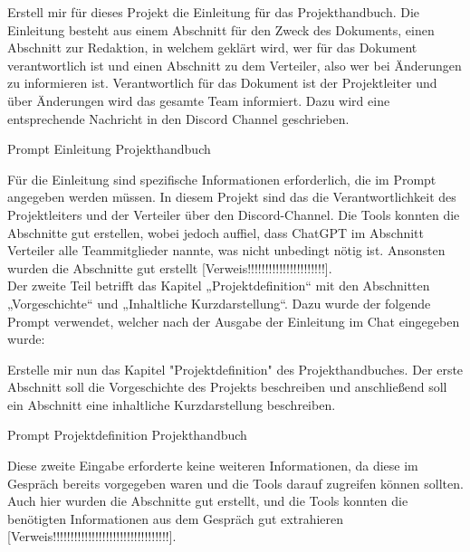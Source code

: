 \begin{prompt}[H]
    \begin{tcolorbox}[colback=gray!20, colframe=gray!20, boxrule=0pt, sharp corners] 
        Erstell mir für dieses Projekt die Einleitung für das Projekthandbuch. Die Einleitung besteht aus einem Abschnitt für 
        den Zweck des Dokuments, einen Abschnitt zur Redaktion, in welchem geklärt wird, wer für das Dokument verantwortlich ist 
        und einen Abschnitt zu dem Verteiler, also wer bei Änderungen zu informieren ist. Verantwortlich für das Dokument ist der 
        Projektleiter und über Änderungen wird das gesamte Team informiert. Dazu wird eine entsprechende Nachricht in den Discord 
        Channel geschrieben.
        \vfill
    \end{tcolorbox}
    \caption{Prompt Einleitung Projekthandbuch}
    \label{Prompt Einleitung Projekthandbuch}
\end{prompt}

Für die Einleitung sind spezifische Informationen erforderlich, die im Prompt angegeben werden müssen. In diesem Projekt sind das die 
Verantwortlichkeit des Projektleiters und der Verteiler über den Discord-Channel. Die Tools konnten die Abschnitte gut erstellen, wobei 
jedoch auffiel, dass ChatGPT im Abschnitt Verteiler alle Teammitglieder nannte, was nicht unbedingt nötig ist. Ansonsten wurden die 
Abschnitte gut erstellt [Verweis!!!!!!!!!!!!!!!!!!!!!!].\\

Der zweite Teil betrifft das Kapitel „Projektdefinition“ mit den Abschnitten „Vorgeschichte“ und „Inhaltliche Kurzdarstellung“. Dazu wurde 
der folgende Prompt verwendet, welcher nach der Ausgabe der Einleitung im Chat eingegeben wurde:

\begin{prompt}[H]
    \begin{tcolorbox}[colback=gray!20, colframe=gray!20, boxrule=0pt, sharp corners] 
        Erstelle mir nun das Kapitel "Projektdefinition" des Projekthandbuches. Der erste Abschnitt soll die Vorgeschichte des Projekts 
        beschreiben und anschließend soll ein Abschnitt eine inhaltliche Kurzdarstellung beschreiben.
        \vfill
    \end{tcolorbox}
    \caption{Prompt Projektdefinition Projekthandbuch}
    \label{Prompt Projektdefinition Projekthandbuch}
\end{prompt}

Diese zweite Eingabe erforderte keine weiteren Informationen, da diese im Gespräch bereits vorgegeben waren und die Tools darauf zugreifen 
können sollten. Auch hier wurden die Abschnitte gut erstellt, und die Tools konnten die benötigten Informationen aus dem Gespräch gut 
extrahieren [Verweis!!!!!!!!!!!!!!!!!!!!!!!!!!!!!!!!!].\\

